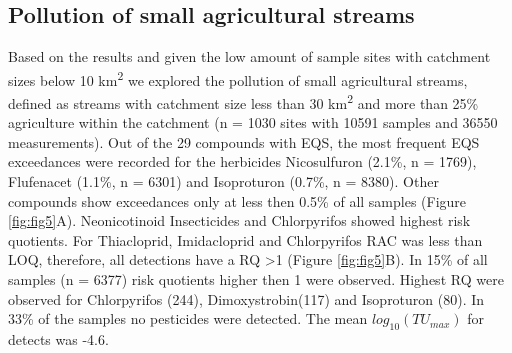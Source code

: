 \documentclass[journal=esthag,manuscript=article]{achemso}
\begin{document}
\subsection{Pollution of small agricultural streams}
Based on the results and given the low amount of sample sites with catchment sizes below 10 km\textsuperscript{2} we explored the pollution of small agricultural streams, defined as streams with catchment size less than 30 km\textsuperscript{2} and more than 25\% agriculture within the catchment (n = 1030 sites with 10591 samples and 36550 measurements).
%
%
%
%
%
%
Out of the 29 compounds with EQS, the most frequent EQS exceedances were recorded for the herbicides Nicosulfuron (2.1\%, n = 1769), Flufenacet (1.1\%, n = 6301) and Isoproturon (0.7\%, n = 8380). 
%
%
Other compounds show exceedances only at less then 0.5\% of all samples (Figure \ref{fig:fig5}A).
Neonicotinoid Insecticides and Chlorpyrifos showed highest risk quotients.
For Thiacloprid, Imidacloprid and Chlorpyrifos RAC was less than LOQ, therefore, all detections have a RQ \textgreater 1 (Figure \ref{fig:fig5}B). 
In 15\% of all samples (n = 6377) risk quotients higher then 1 were observed.
Highest RQ were observed for Chlorpyrifos (244), Dimoxystrobin(117) and Isoproturon (80). 
In 33\% of the samples no pesticides were detected. 
The mean $log_{10}(TU_{max})$ for detects was -4.6.
\end{document}
